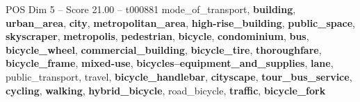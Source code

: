 \begin{textsample}{POS Dim 5 – Score 21.00 – t000881}  \label{ex:f5_pos_009}
mode\_of\_transport, \textbf{building}, \textbf{urban\_area}, \textbf{city}, \textbf{metropolitan\_area}, \textbf{high-rise\_building}, \textbf{public\_space}, \textbf{skyscraper}, \textbf{metropolis}, \textbf{pedestrian}, \textbf{bicycle}, \textbf{condominium}, \textbf{bus}, \textbf{bicycle\_wheel}, \textbf{commercial\_building}, \textbf{bicycle\_tire}, \textbf{thoroughfare}, \textbf{bicycle\_frame}, \textbf{mixed-use}, \textbf{bicycles--equipment\_and\_supplies}, \textbf{lane}, public\_transport, travel, \textbf{bicycle\_handlebar}, \textbf{cityscape}, \textbf{tour\_bus\_service}, \textbf{cycling}, \textbf{walking}, \textbf{hybrid\_bicycle}, road\_bicycle, \textbf{traffic}, \textbf{bicycle\_fork}

\end{textsample}
